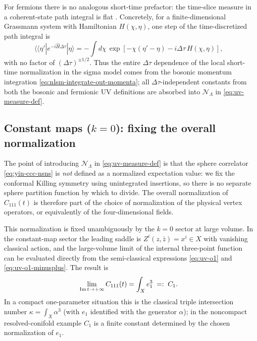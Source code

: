 \documentclass[12pt]{article}
\begin{document}
For fermions there is no analogous short-time prefactor: the time-slice measure
in a coherent-state path integral is flat \cite[Eq.~(B.31)]{Yin:FoundationsStringTheory}.
Concretely, for a finite-dimensional Grassmann system with Hamiltonian
$H(\chi,\eta)$, one step of the time-discretized path integral is
\begin{equation}
  \langle\!\langle \eta'|e^{-i\hat H\Delta\tau}|\eta\rangle
  =
  -\int d\chi\,
  \exp\!\left[-\chi(\eta'-\eta)-i\Delta\tau\,H(\chi,\eta)\right],
  \label{eq:uv-fermion-timeslice}
\end{equation}
with no factor of $(\Delta\tau)^{\pm 1/2}$. Thus the entire $\Delta\tau$
dependence of the local short-time normalization in the sigma model comes from
the bosonic momentum integration \eqref{eq:nlsm-integrate-out-momenta}; all
$\Delta\tau$-independent constants from both the bosonic and fermionic UV
definitions are absorbed into $\mathcal{N}_\Lambda$ in
\eqref{eq:uv-measure-def}.

\subsection{Constant maps ($k=0$): fixing the overall normalization}
\label{app:uv-k0}
The point of introducing $\mathcal{N}_\Lambda$ in \eqref{eq:uv-measure-def} is
that the sphere correlator \eqref{eq:yin-ccc-nsns} is \emph{not} defined as a
normalized expectation value: we fix the conformal Killing symmetry using
unintegrated insertions, so there is no separate sphere partition function by
which to divide. The overall normalization of $C_{111}(t)$ is therefore part of
the choice of normalization of the physical vertex operators, or equivalently
of the four-dimensional fields.

This normalization is fixed unambiguously by the $k=0$ sector at large volume.
In the constant-map sector the leading saddle is $Z^i(z,\bar z)=x^i\in X$ with
vanishing classical action, and the large-volume limit of the internal
three-point function can be evaluated directly from the semi-classical
expressions \eqref{eq:uv-o1} and \eqref{eq:uv-o1-minusplus}. The result is
\cite[Eq.~(19.182)]{Yin:FoundationsStringTheory}
\begin{equation}
  \lim_{{\rm Im}\,t\to+\infty} C_{111}(t)
  =
  \int_X e_1^3
  \;=:\;
  C_1.
  \label{eq:uv-k0-result}
\end{equation}
In a compact one-parameter situation this is the classical triple intersection
number $\kappa=\int_X \alpha^3$ (with $e_1$ identified with the generator
$\alpha$); in the noncompact resolved-conifold example $C_1$ is a finite
constant determined by the chosen normalization of $e_1$.
\end{document}
